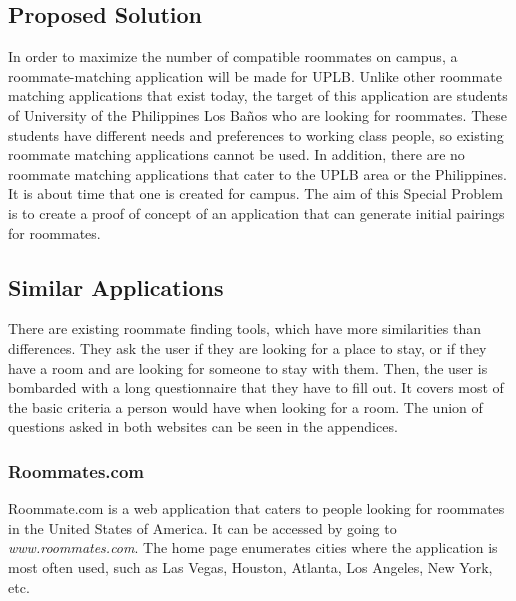 \documentclass[journal]{./IEEE/IEEEtran}
\newcommand{\UPLB}{University of the Philippines Los Ba\~{n}os }
\begin{document}
    \subsection{Proposed Solution}
    In order to maximize the number of compatible roommates on campus, a roommate-matching application will be made for
    UPLB. Unlike other roommate matching applications that exist today, the target of this application are students of
    \UPLB who are looking for roommates. These students have different needs and preferences to working class people, so
    existing roommate matching applications cannot be used. In addition, there are no roommate matching applications
    that cater to the UPLB area or the Philippines. It is about time that one is created for campus. The aim of this
    Special Problem is to create a proof of concept of an application that can generate initial pairings for roommates.


\pubidadjcol

    \subsection{Similar Applications}
    There are existing roommate finding tools, which have more similarities than differences. They ask the user if they are
    looking for a place to stay, or if they have a room and are looking for someone to stay with them. Then, the user is
    bombarded with a long questionnaire that they have to fill out. It covers most of the basic criteria a person would have
    when looking for a room. The union of questions asked in both websites can be seen in the appendices. 

        \subsubsection{Roommates.com}
        Roommate.com\cite{roommates.com} is a web application that caters to people looking for roommates in the United States
        of America. It can be accessed by going to \textit{www.roommates.com}. The home page enumerates cities where the
        application is most often used, such as Las Vegas, Houston, Atlanta, Los Angeles, New York, etc. 
\end{document}
